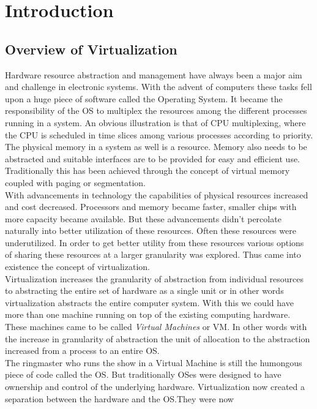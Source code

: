 
\chapter{Introduction}

\section{Overview of Virtualization}
Hardware resource abstraction and management have always been a major aim and challenge in
electronic systems. With the advent of computers these tasks fell upon a huge piece of software
called the Operating System. It became the responsibility of the OS to multiplex the resources
among the different processes running in a system. An obvious illustration is that of CPU
multiplexing, where the CPU is scheduled in time slices among various processes according to
priority. The physical memory in a system as well is a resource. Memory also needs to be
abstracted and suitable interfaces are to be provided for easy and efficient use. Traditionally
this has been achieved through the concept of virtual memory coupled with paging or segmentation.
\\
With advancements in technology the capabilities of physical resources increased and cost
decreased. Processors and memory became faster, smaller chips with more capacity became available.
But these advancements didn't percolate naturally into better utilization of these resources.
Often these resources were underutilized. In order to get better utility from these resources
various options of sharing these resources at a larger granularity was explored. Thus came into
existence the concept of virtualization.\\
Virtualization increases the granularity of abstraction from individual resources to abstracting
the entire set of hardware as a single unit or in other words virtualization abstracts the entire
computer system. With this we could have more than one machine running on top of the existing
computing hardware. These machines came to be called \textit{Virtual Machines} or VM. In other
words with the increase in granularity of abstraction the unit of allocation to the abstraction
increased from a process to an entire OS.\\
The ringmaster who runs the show in a Virtual Machine is still the humongous piece of code called
the OS. But traditionally OSes were designed to have ownership and control of the underlying
hardware. Virtualization now created a separation between the hardware and the OS.They were now
